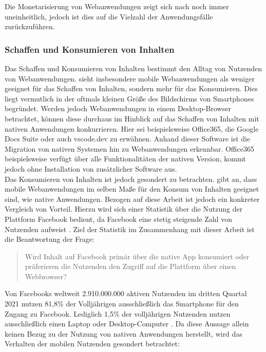 \documentclass[a4paper]{scrartcl}
\begin{document}
Die Monetarisierung von Webanwendungen zeigt sich nach \textcite[28]{Jobe} noch immer uneinheitlich, jedoch ist dies auf die Vielzahl der Anwendungsfälle zurückzuführen.

\subsubsection{Schaffen und Konsumieren von Inhalten}

Das Schaffen und Konsumieren von Inhalten bestimmt den Alltag von Nutzenden von Webanwendungen. \textcite[28]{Jobe} sieht insbesondere mobile Webanwendungen als weniger geeignet für das Schaffen von Inhalten, sondern mehr für das Konsumieren. Dies liegt vermutlich in der oftmals kleinen Größe des Bildschirms von Smartphones begründet. Werden jedoch Webanwendungen in einem Desktop-Browser betrachtet, können diese durchaus im Hinblick auf das Schaffen von Inhalten mit nativen Anwendungen konkurrieren. Hier sei beispielsweise Office365, die Google Docs Suite oder auch vscode.dev zu erwähnen. Anhand dieser Software ist die Migration von nativen Systemen hin zu Webanwendungen erkennbar. Office365 beispielsweise verfügt über alle Funktionalitäten der nativen Version, kommt jedoch ohne Installation von zusätzlicher Software aus. \\

Das Konsumieren von Inhalten ist jedoch gesondert zu betrachten. \textcite[28]{Jobe} gibt an, dass mobile Webanwendungen im selben Maße für den Konsum von Inhalten geeignet sind, wie native Anwendungen. Bezogen auf diese Arbeit ist jedoch ein konkreter Vergleich von Vorteil. Hierzu wird sich einer Statistik über die Nutzung der Plattform Facebook bedient, da Facebook eine stetig steigende Zahl von Nutzenden aufweist \autocite{Statista_Facebook}. Ziel der Statistik im Zusammenhang mit dieser Arbeit ist die Beantwortung der Frage: 
\begin{quote}
	Wird Inhalt auf Facebook primär über die native App konsumiert oder präferieren die Nutzenden den Zugriff auf die Plattform über einen Webbrowser?
\end{quote}

Von Facebooks weltweit 2.910.000.000 aktiven Nutzenden im dritten Quartal 2021 \textcite{Statista_Facebook} nutzen 81,8\% der Volljährigen ausschließlich das Smartphone für den Zugang zu Facebook. Lediglich 1,5\% der volljährigen Nutzenden nutzen ausschließlich einen Laptop oder Desktop-Computer \autocite{Kemp_Facebook}. Da diese Aussage allein keinen Bezug zu der Nutzung von nativen Anwendungen herstellt, wird das Verhalten der mobilen Nutzenden gesondert betrachtet: 
\end{document}
